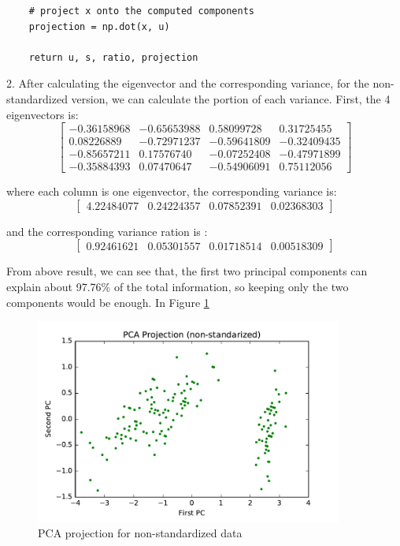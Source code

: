 \begin{description}
\begin{lstlisting}
    # project x onto the computed components
    projection = np.dot(x, u)
    
    return u, s, ratio, projection
\end{lstlisting}

\item{2. }
After calculating the eigenvector and the corresponding variance, for the non-standardized version, we can calculate the portion of each variance.
First, the 4 eigenvectors is:
$$
\begin{bmatrix}
 -0.36158968 & -0.65653988 &  0.58099728 &  0.31725455 \\
  0.08226889 & -0.72971237 & -0.59641809 & -0.32409435 \\
 -0.85657211 &  0.17576740 & -0.07252408 & -0.47971899 \\
 -0.35884393 &  0.07470647 & -0.54906091 &  0.75112056
\end{bmatrix}
$$ 

where each column is one eigenvector, the corresponding variance is:
$$\begin{bmatrix}
4.22484077 & 0.24224357 & 0.07852391 & 0.02368303
\end{bmatrix}$$

and the corresponding variance ration is :
$$\begin{bmatrix}
0.92461621 & 0.05301557 & 0.01718514 & 0.00518309
\end{bmatrix}$$

From above result, we can see that, the first two principal components can explain about 97.76\% of the total information, so keeping only the two components would be enough. In Figure \ref{fig:pca_1}

\begin{figure}[H]
\centering
\includegraphics[width=0.9\textwidth]{./figures/projection1.pdf}
\caption{\label{fig:pca_1} PCA projection for non-standardized data}
\end{figure}


\end{description}
